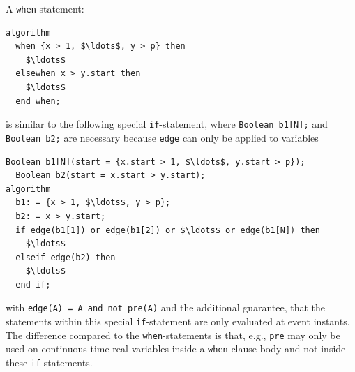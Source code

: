 A \lstinline!when!-statement:
\begin{lstlisting}[language=modelica]
algorithm
  when {x > 1, $\ldots$, y > p} then
    $\ldots$
  elsewhen x > y.start then
    $\ldots$
  end when;
\end{lstlisting}
is similar to the following special \lstinline!if!-statement, where \lstinline!Boolean b1[N];! and \lstinline!Boolean b2;! are necessary because \lstinline!edge! can only be applied to variables
\begin{lstlisting}[language=modelica]
  Boolean b1[N](start = {x.start > 1, $\ldots$, y.start > p});
  Boolean b2(start = x.start > y.start);
algorithm
  b1: = {x > 1, $\ldots$, y > p};
  b2: = x > y.start;
  if edge(b1[1]) or edge(b1[2]) or $\ldots$ or edge(b1[N]) then
    $\ldots$
  elseif edge(b2) then
    $\ldots$
  end if;
\end{lstlisting}
with \lstinline!edge(A) = A and not pre(A)! and the additional guarantee, that the statements within this special \lstinline!if!-statement are only evaluated at event instants.
The difference compared to the \lstinline!when!-statements is that, e.g., \lstinline!pre! may only be used on continuous-time real variables inside a \lstinline!when!-clause body and not inside these \lstinline!if!-statements.

